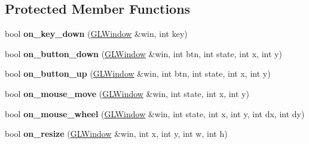 \subsection*{Protected Member Functions}
\begin{DoxyCompactItemize}
\item 
\mbox{\label{classglwindow_1_1_scene_window_a1482ec985ea436cb29e8da14cf7c55b5}} 
bool {\bfseries on\+\_\+key\+\_\+down} (\hyperlink{classglwindow_1_1_g_l_window}{G\+L\+Window} \&win, int key)
\item 
\mbox{\label{classglwindow_1_1_scene_window_a75cabfd481bb531d37ee5637c207311e}} 
bool {\bfseries on\+\_\+button\+\_\+down} (\hyperlink{classglwindow_1_1_g_l_window}{G\+L\+Window} \&win, int btn, int state, int x, int y)
\item 
\mbox{\label{classglwindow_1_1_scene_window_a10c408229e2f6baea755a07e56a28644}} 
bool {\bfseries on\+\_\+button\+\_\+up} (\hyperlink{classglwindow_1_1_g_l_window}{G\+L\+Window} \&win, int btn, int state, int x, int y)
\item 
\mbox{\label{classglwindow_1_1_scene_window_a3c67279c10c4cff40aacac9571091f12}} 
bool {\bfseries on\+\_\+mouse\+\_\+move} (\hyperlink{classglwindow_1_1_g_l_window}{G\+L\+Window} \&win, int state, int x, int y)
\item 
\mbox{\label{classglwindow_1_1_scene_window_a0186ad496adbcc11ada5ac24f4d7f37d}} 
bool {\bfseries on\+\_\+mouse\+\_\+wheel} (\hyperlink{classglwindow_1_1_g_l_window}{G\+L\+Window} \&win, int state, int x, int y, int dx, int dy)
\item 
\mbox{\label{classglwindow_1_1_scene_window_a932e76733ea8d6197ec9453c1ef09553}} 
bool {\bfseries on\+\_\+resize} (\hyperlink{classglwindow_1_1_g_l_window}{G\+L\+Window} \&win, int x, int y, int w, int h)
\end{DoxyCompactItemize}
